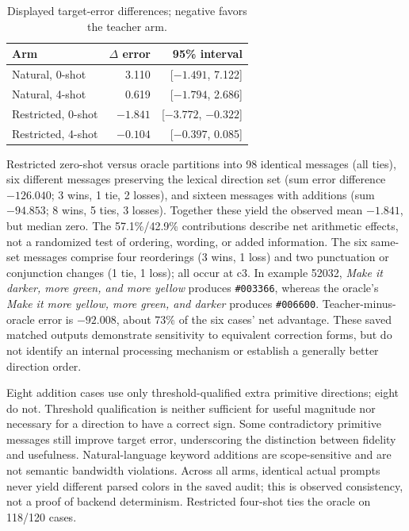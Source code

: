 \begin{table}[H]
\centering\small
\begin{tabular}{@{}lrr@{}}
\toprule
Arm & $\Delta$ error & 95\% interval \\
\midrule
Natural, 0-shot & 3.110 & [$-1.491$, 7.122] \\
Natural, 4-shot & 0.619 & [$-1.794$, 2.686] \\
Restricted, 0-shot & $-1.841$ & [$-3.772$, $-0.322$] \\
Restricted, 4-shot & $-0.104$ & [$-0.397$, 0.085] \\
\bottomrule
\end{tabular}
\caption{Displayed target-error differences; negative favors the teacher arm.}
\end{table}

Restricted zero-shot versus oracle partitions into 98 identical messages
(all ties), six different messages preserving the lexical direction set
(sum error difference $-126.040$; 3 wins, 1 tie, 2 losses), and sixteen
messages with additions (sum $-94.853$; 8 wins, 5 ties, 3 losses).
Together these yield the observed mean $-1.841$, but median zero.
The 57.1\%/42.9\% contributions describe net arithmetic effects, not a
randomized test of ordering, wording, or added information. The six same-set
messages comprise four reorderings (3 wins, 1 loss) and two punctuation or
conjunction changes (1 tie, 1 loss); all occur at c3. In example 52032,
\textit{Make it darker, more green, and more yellow} produces
\texttt{\#003366}, whereas the oracle's
\textit{Make it more yellow, more green, and darker} produces
\texttt{\#006600}. Teacher-minus-oracle error is $-92.008$, about 73\% of
the six cases' net advantage. These saved matched outputs demonstrate
sensitivity to equivalent correction forms, but do not identify an internal
processing mechanism or establish a generally better direction order.

Eight addition cases use only threshold-qualified extra primitive directions;
eight do not. Threshold qualification is neither sufficient for useful
magnitude nor necessary for a direction to have a correct sign. Some
contradictory primitive messages still improve target error, underscoring the
distinction between fidelity and usefulness. Natural-language keyword
additions are scope-sensitive and are not semantic bandwidth violations.
Across all arms, identical actual prompts never yield different parsed
colors in the saved audit; this is observed consistency, not a proof of
backend determinism. Restricted four-shot ties the oracle on 118/120 cases.

